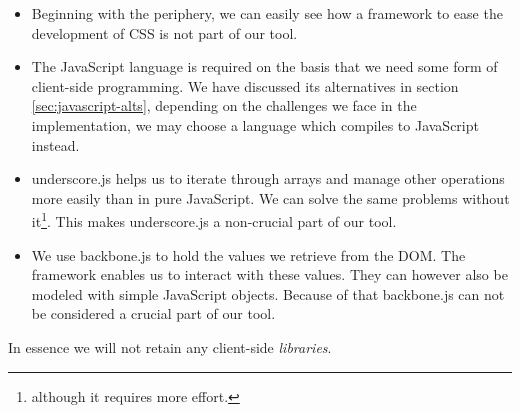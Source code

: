 \documentclass[thesis.tex]{subfiles}
\begin{document}
\begin{itemize}
\item Beginning with the periphery, we can easily see how a framework to ease
the development of CSS is not part of our tool.
\item The JavaScript language is required on the basis that we need some form of
client-side programming. We have discussed its alternatives in
section \ref{sec:javascript-alts}, depending on the challenges we face in the
implementation, we may choose a language which compiles to JavaScript instead.
\item underscore.js helps us to iterate through arrays and manage other
operations more easily than in pure JavaScript. We can solve the same problems
without it\footnote{
	although it requires more effort.
}. This makes underscore.js a non-crucial part of our tool.
\item We use backbone.js to hold the values we retrieve from the DOM. The
framework enables us to interact with these values. They can however also be
modeled with simple JavaScript objects. Because of that backbone.js can not be
considered a crucial part of our tool.
\end{itemize}

In essence we will not retain any client-side \emph{libraries}.
\end{document}
